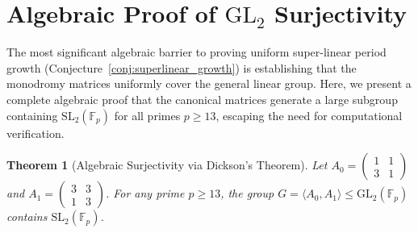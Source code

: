 \documentclass[11pt]{article}
\theoremstyle{plain}
\newtheorem{theorem}{Theorem}[section]
\theoremstyle{definition}
\begin{document}

\section{Algebraic Proof of $\mathrm{GL}_2$ Surjectivity}
\label{sec:dickson}
The most significant algebraic barrier to proving uniform super-linear period growth (Conjecture~\ref{conj:superlinear_growth}) is establishing that the monodromy matrices uniformly cover the general linear group. Here, we present a complete algebraic proof that the canonical matrices generate a large subgroup containing $\mathrm{SL}_2(\mathbb{F}_p)$ for all primes $p \ge 13$, escaping the need for computational verification.

\begin{theorem}[Algebraic Surjectivity via Dickson's Theorem]
\label{thm:dickson}
Let $A_0 = \begin{pmatrix} 1 & 1 \\ 3 & 1 \end{pmatrix}$ and $A_1 = \begin{pmatrix} 3 & 3 \\ 1 & 3 \end{pmatrix}$. For any prime $p \ge 13$, the group $G = \langle A_0, A_1 \rangle \le \mathrm{GL}_2(\mathbb{F}_p)$ contains $\mathrm{SL}_2(\mathbb{F}_p)$.
\end{theorem}
\end{document}

